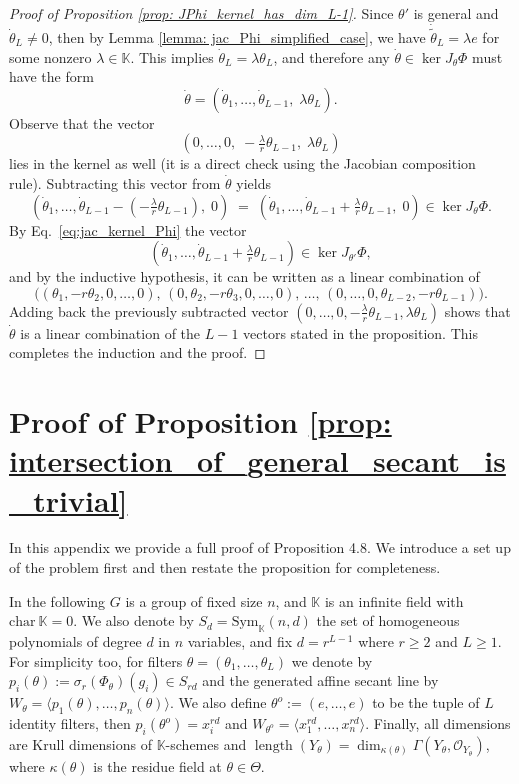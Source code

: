 \documentclass[final]{article}
\newcommand{\K}{\mathbb{K}}
\newcommand{\Sym}{\text{Sym}}
\theoremstyle{definition}
\theoremstyle{plain}
\begin{document}
\begin{proof}[Proof of Proposition \ref{prop: JPhi_kernel_has_dim_L-1}]
Since $\theta'$ is general and $\dot \theta_L \neq 0$, then by Lemma \ref{lemma: jac_Phi_simplified_case}, we have $\dot{\tilde{\theta}}_L = \lambda e$ for some nonzero $\lambda \in \K$.
This implies $\dot \theta_L = \lambda \theta_L$, and therefore any $\dot\theta\in\ker J_\theta\Phi$ must have the form
\[
\dot\theta = (\dot\theta_1,\dots,\dot\theta_{L-1},\;\lambda\theta_L).
\]
Observe that the vector
\[
(0,\dots,0,\;-\tfrac{\lambda}{r}\theta_{L-1},\;\lambda\theta_L)
\]
lies in the kernel as well (it is a direct check using the Jacobian composition rule). Subtracting this vector from $\dot\theta$ yields
\[
(\dot\theta_1,\dots,\dot\theta_{L-1}-(-\tfrac{\lambda}{r}\theta_{L-1}),\;0)
\;=\;
(\dot\theta_1,\dots,\dot\theta_{L-1}+\tfrac{\lambda}{r}\theta_{L-1},\;0)
\in \ker J_{\theta}\Phi.
\]
By Eq.~\eqref{eq:jac_kernel_Phi} the vector 
\[(\dot\theta_1,\dots,\dot\theta_{L-1}+\tfrac{\lambda}{r}\theta_{L-1}) \in \ker J_{\theta'}\Phi,
\]
and by the inductive hypothesis, it can be written as a linear combination of
\[
\bigl((\theta_1,-r\theta_2,0,\dots,0),\,
(0,\theta_2,-r\theta_3,0,\dots,0),\,
\dots,\,
(0,\dots,0,\theta_{L-2},-r\theta_{L-1})\bigr).
\]
Adding back the previously subtracted vector
$(0,\dots,0,-\tfrac{\lambda}{r}\theta_{L-1},\lambda\theta_L)$
shows that $\dot\theta$ is a linear combination of the $L-1$ vectors stated in the proposition.
This completes the induction and the proof.

\end{proof}





\section{Proof of Proposition \ref{prop: intersection_of_general_secant_is_trivial}} \label{appendix: proof_proposition_4.8}


In this appendix we provide a full proof of Proposition 4.8.
We introduce a set up of the problem first and then restate the proposition for completeness.

In the following $G$ is a group of fixed size $n$, and $\K$ is an infinite field with $\text{char}\ \K = 0$. 
We also denote by $S_d = \Sym_\K(n, d)$ the set of homogeneous polynomials of degree  $d$ in $n$ variables, and fix $d = r^{L-1}$ where $r\geq 2$ and $L\geq 1$. 
For simplicity too, for filters $\theta=(\theta_1, \dots, \theta_L)$ we denote by $p_i(\theta) := \sigma_r(\Phi_\theta)(g_i)\in S_{rd}$ and the generated affine secant line by $W_\theta = \langle p_1(\theta), \dots, p_n(\theta) \rangle $.
 We also define $\theta^o := (e, \dots, e)$ to be the tuple of $L$ identity filters, then $p_i(\theta^o) = x_i^{rd}$ and $W_{\theta^o} = \langle x_1^{rd}, \dots, x_n^{rd}\rangle$.
 Finally, all dimensions are Krull dimensions of $\K$-schemes and $\operatorname{length} (Y_\theta) = \dim_{\kappa(\theta)} \Gamma(Y_\theta, \mathcal{O}_{Y_\theta})$, where $\kappa(\theta)$ is the residue field at $\theta\in \Theta$.
\end{document}
